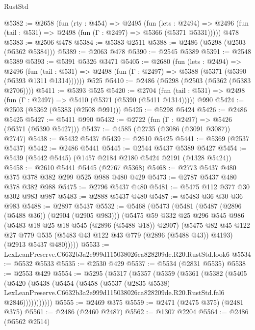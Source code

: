 \begin{lexlean}{RustStd}
\begin{coremodule}
@5382 := @2658
    (fun (rty : @454) =>
    @2495
      (fun (lets : @2494) =>
      @2496 (fun (tail : @531) => @2498 (fun (Γ : @2497) => @5366 (@5371 @5331)))))
    @478
@5383 := @2506 @478
@5384 := @5383 @2511
@5388 := @2486 (@5298 (@2503 (@5362 @5384)))
@5389 := @2063 @478
@5390 := @2545 @5389
@5391 := @2548 @5389
@5393 := @5391 @5326 @3471
@5405 := @2680
    (fun (lets : @2494) =>
    @2496
      (fun (tail : @531) => @2498 (fun (Γ : @2497) => @5388 (@5371 (@5390 (@5393 @1311 @1314))))))
    @525
@5410 := @2486 (@5298 (@2503 (@5362 (@5383 @2706))))
@5411 := @5393 @525
@5420 := @2704
    (fun (tail : @531) => @2498 (fun (Γ : @2497) => @5410 (@5371 (@5390 (@5411 @1314)))))
    @990
@5424 := @2503 (@5362 (@5383 (@2508 @991)))
@5425 := @5298 @5424
@5426 := @2486 @5425
@5427 := @5411 @990
@5432 := @2722 (fun (Γ : @2497) => @5426 (@5371 (@5390 @5427)))
@5437 := @4585 (@2735 (@3086 (@3091 @3087)) @2747)
@5438 := @5432 @5437
@5439 := @2610 @5425
@5441 := @5369 (@2537 @5437)
@5442 := @2486 @5441
@5445 := @2544 @5437 @5389 @5427
@5454 := @5439 (@5442 @5445) (@1457 @2184 @2180 @5424 @2191 (@1328 @5424))
@5458 := @2610 @5441 @5445 (@2767 @5368)
@5468 := @2773 @5437 @480 @375 @378 @382 @299 @525 @988 @480 @429
@5473 := @2787 @5437 @480 @378 @382 @988
@5475 := @2796 @5437 @480
@5481 := @5475 @112 @377 @30 @302 @983 @987
@5483 := @2888 @5437 @480
@5487 := @5483 @36 @30 @36 @983
@5488 := @2897 @5437
@5532 := @5468
    (@5473
      (@5481
        (@5487 (@2896 (@5488 @36)) (@2904 (@2905 @983)))
        (@5475
          @59
          @332
          @25
          @296
          @545
          @986
          (@5483 @18 @25 @18 @545 (@2896 (@5488 @18)) @2907)
          (@5475
            @82
            @45
            @122
            @27
            @779
            @535
            (@5483 @43 @122 @43 @779 (@2896 (@5488 @43)) @4193)
            (@2913 @5437 @480)))))
@5533 := LexLeanPreserve.C6632b3a2e999d115038026ca828209de.R20.RustStd.look6
@5534 := @5532 @5533
@5535 := @2530 @429
@5537 := @5534 (@2831 @5535)
@5538 := @2553 @429
@5554 := @5295
    (@5317
      (@5357
        (@5359
          (@5361
            (@5382
              (@5405
                (@5420
                  (@5438
                    (@5454
                      (@5458
                        (@5537
                          (@2835 @5538)
                          LexLeanPreserve.C6632b3a2e999d115038026ca828209de.R20.RustStd.fal6
                          @2846)))))))))))
@5555 := @2469 @375
@5559 := @2471 (@2475 @375) (@2481 @375)
@5561 := @2486 (@2460 @2487)
@5562 := @1307 @2204
@5564 := @2486 (@5562 @2514)

\end{coremodule}
\end{lexlean}
